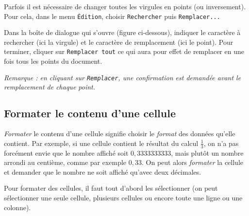 Parfois il est nécessaire de changer toutes les virgules en points (ou inversement). Pour cela, dans le menu \texttt{Édition}, choisir \texttt{Rechercher} puis \texttt{Remplacer...}


Dans la boîte de dialogue qui s'ouvre (figure ci-dessous), indiquer le caractère à rechercher  (ici la virgule) et le caractère de remplacement  (ici le point). Pour terminer, cliquer sur \texttt{Remplacer tout}  ce qui aura pour effet de remplacer en une fois tous les points du document.

\emph{Remarque : en cliquant sur \texttt{Remplacer}, une confirmation est demandée avant le remplacement de chaque point.}



\subsection{Formater le contenu d'une cellule}\label{Calc2FormaterCellule} 

\emph{Formater} le contenu d'une cellule signifie choisir le \emph{format} des données qu'elle contient. Par exemple, si une cellule contient le résultat du calcul $\frac{1}{3}$, on n'a pas forcément envie que le nombre affiché soit $0,3333333333$, mais plutôt un nombre arrondi au centième, comme par exemple $0,33$. On peut alors \emph{formater} la cellule et demander que le nombre ne soit affiché qu'avec deux décimales.

Pour formater des cellules, il faut tout d'abord les sélectionner (on peut sélectionner une seule cellule, plusieurs cellules ou encore toute une ligne ou une colonne).


